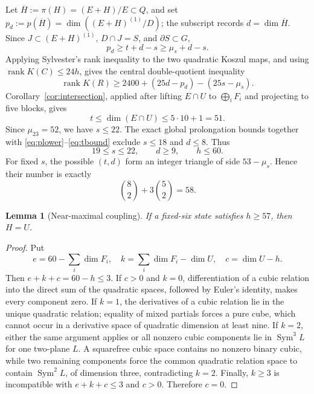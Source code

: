 \documentclass[11pt,reqno]{amsart}
\newtheorem{lemma}[theorem]{Lemma}
\theoremstyle{definition}
\newcommand{\Sym}{\operatorname{Sym}}
\newcommand{\rank}{\operatorname{rank}}
\begin{document}
Let \(\overline H:=\pi(H)=(E+H)/E\subset Q\), and set
\(p_d:=p(\overline H)=\dim((E+H)^{(1)}/D)\); the subscript records
\(d=\dim\overline H\). Since
\(J\subset(E+H)^{(1)}\), \(D\cap J=S\), and \(\partial S\subset G\),
\begin{equation}\label{eq:plower}
 p_d\ge t+d-s\ge \mu_s+d-s.
\end{equation}
Applying Sylvester's rank inequality to the two quadratic Koszul maps, and
using \(\rank K(C)\le24h\), gives the central double-quotient inequality
\begin{equation}\label{eq:double}
 \rank K(R)\ge2400+(25d-p_d)-(25s-\mu_s).
\end{equation}
Corollary~\ref{cor:intersection}, applied after lifting \(E\cap U\) to
\(\bigoplus_iF_i\) and projecting to five blocks, gives
\begin{equation}\label{eq:tbound}
 t\le\dim(E\cap U)\le5\cdot10+1=51.
\end{equation}
Since \(\mu_{23}=52\), we have \(s\le22\). The exact global prolongation bounds
together with \eqref{eq:plower}--\eqref{eq:tbound} exclude \(s\le18\) and
\(d\le8\). Thus
\[
 19\le s\le22,\qquad d\ge9,\qquad h\le60.
\]
For fixed \(s\), the possible \((t,d)\) form an integer triangle of side
\(53-\mu_s\). Hence their number is exactly
\[
 \binom82+3\binom52=58.
\]

\begin{lemma}[Near-maximal coupling]\label{lem:coupling}
If a fixed-six state satisfies \(h\ge57\), then \(H=U\).
\end{lemma}

\begin{proof}
Put
\[
 e=60-\sum_i\dim F_i,\quad
 k=\sum_i\dim F_i-\dim U,\quad c=\dim U-h.
\]
Then \(e+k+c=60-h\le3\). If \(c>0\) and \(k=0\), differentiation of a
cubic relation into the direct sum of the quadratic spaces, followed by
Euler's identity, makes every component zero. If \(k=1\), the derivatives of
a cubic relation lie in the unique quadratic relation; equality of mixed
partials forces a pure cube, which cannot occur in a derivative space of
quadratic dimension at least nine. If \(k=2\), either the same argument
applies or all nonzero cubic components lie in \(\Sym^3L\) for one two-plane
\(L\). A squarefree cubic space contains no nonzero binary cubic, while two
remaining components force the common quadratic relation space to contain
\(\Sym^2L\), of dimension three, contradicting \(k=2\). Finally, \(k\ge3\)
is incompatible with \(e+k+c\le3\) and \(c>0\). Therefore \(c=0\).
\end{proof}
\end{document}
